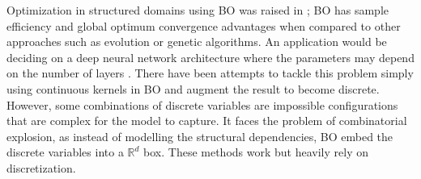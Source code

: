 \documentclass[
    american,a4paper
    ]{scrartcl}
\newcommand{\lang}{en}
\begin{document}
\begin{description}[style=unboxed]
            \item [\questionTwo{\lang}]
                Optimization in structured domains using BO was raised in \cite{NeurIPS2017};
                BO has sample efficiency and global optimum convergence advantages when compared to other approaches such as evolution or genetic algorithms.
                An application would be deciding on a deep neural network architecture where the parameters may depend on the number of layers \cite{bengio2009learning}.
                There have been attempts to tackle this problem simply using continuous kernels in BO and augment the result to become discrete.
                However, some combinations of discrete variables are impossible configurations that are complex for the model to capture.
                It faces the problem of combinatorial explosion, as instead of modelling the structural dependencies, 
                BO embed the discrete variables into a $\mathbb{R}^d$ box.
                These methods work but heavily rely on discretization.


\end{description}
\end{document}
